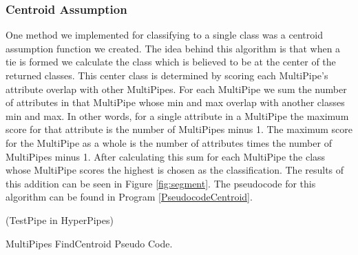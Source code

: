 \subsubsection{Centroid Assumption}
One method we implemented for classifying to a single class was
a centroid assumption function we created. The idea behind this
algorithm is that when a tie is formed we calculate the class 
which is believed to be at the center of the returned classes. 
This center class is determined by scoring each MultiPipe's 
attribute overlap with other MultiPipes. For each MultiPipe we 
sum the number of attributes in that MultiPipe whose min and max 
overlap with another classes min and max. In other words, for a 
single attribute in a MultiPipe the maximum score for that 
attribute is the number of MultiPipes minus 1. The maximum score 
for the MultiPipe as a whole is the number of attributes times 
the number of MultiPipes minus 1. After calculating this sum for 
each MultiPipe the class whose MultiPipe scores the highest 
is chosen as the classification. The results of this addition can 
be seen in Figure \ref{fig:segment}. The pseudocode for this 
algorithm can be found in Program \ref{PseudocodeCentroid}.
\begin{program}
\begin{algorithmic}
\ForAll(TestPipe in HyperPipes)
\EndIf
\EndFor
\EndIf
\EndFor
\EndFor
\EndProcedure
\end{algorithmic}
\caption{MultiPipes FindCentroid Pseudo Code.}\label{PseudocodeCentroid}
\end{program}


